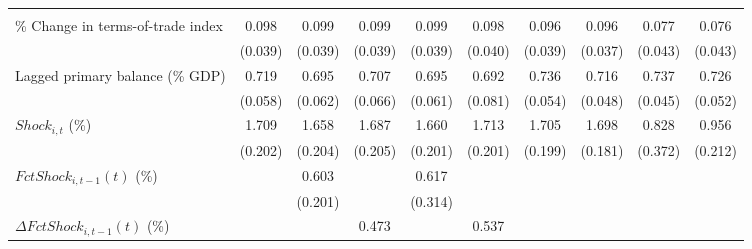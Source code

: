 {\begin{tabular}{l*{9}{c}}
                    &                     &                     &                     &                     &                     &                     &                     &                     &                     \\
\addlinespace
\% Change in terms-of-trade index&       0.098\sym{**} &       0.099\sym{**} &       0.099\sym{**} &       0.099\sym{**} &       0.098\sym{**} &       0.096\sym{**} &       0.096\sym{**} &       0.077\sym{*}  &       0.076\sym{*}  \\
                    &     (0.039)         &     (0.039)         &     (0.039)         &     (0.039)         &     (0.040)         &     (0.039)         &     (0.037)         &     (0.043)         &     (0.043)         \\
\addlinespace
Lagged primary balance (\% GDP)&       0.719\sym{***}&       0.695\sym{***}&       0.707\sym{***}&       0.695\sym{***}&       0.692\sym{***}&       0.736\sym{***}&       0.716\sym{***}&       0.737\sym{***}&       0.726\sym{***}\\
                    &     (0.058)         &     (0.062)         &     (0.066)         &     (0.061)         &     (0.081)         &     (0.054)         &     (0.048)         &     (0.045)         &     (0.052)         \\
\addlinespace
$ Shock_{i,t}$ (\%) &       1.709\sym{***}&       1.658\sym{***}&       1.687\sym{***}&       1.660\sym{***}&       1.713\sym{***}&       1.705\sym{***}&       1.698\sym{***}&       0.828\sym{**} &       0.956\sym{***}\\
                    &     (0.202)         &     (0.204)         &     (0.205)         &     (0.201)         &     (0.201)         &     (0.199)         &     (0.181)         &     (0.372)         &     (0.212)         \\
\addlinespace
$ FctShock_{i,t-1}(t)$ (\%)&                     &       0.603\sym{***}&                     &       0.617\sym{*}  &                     &                     &                     &                     &                     \\
                    &                     &     (0.201)         &                     &     (0.314)         &                     &                     &                     &                     &                     \\
\addlinespace
$ \Delta FctShock_{i,t-1}(t)$ (\%)&                     &                     &       0.473         &                     &       0.537         &                     &                     &                     &                     \\

\end{tabular}}
